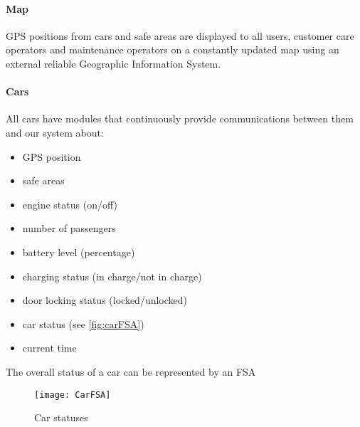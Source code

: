 	\paragraph{Map} GPS positions from cars and safe areas are displayed to all users, customer care operators and maintenance operators on a constantly updated map using an external reliable Geographic Information System.

	\paragraph{Cars}\label{sec:cars}All cars have modules that continuously provide communications between them and our system about:
	\begin{itemize}
		\item GPS position
		\item safe areas
		\item engine status (on/off)
		\item number of passengers
		\item battery level (percentage)
		\item charging status (in charge/not in charge)
		\item door locking status (locked/unlocked)
		\item car status (see \autoref{fig:carFSA})
		\item current time
	\end{itemize}	
	The overall status of a car can be represented by an FSA
	\begin{figure}[h]
			\centering
			\texttt{[image: CarFSA]}
			\caption{
				\label{fig:carFSA} 
				Car statuses
			}
		\end{figure}
		
